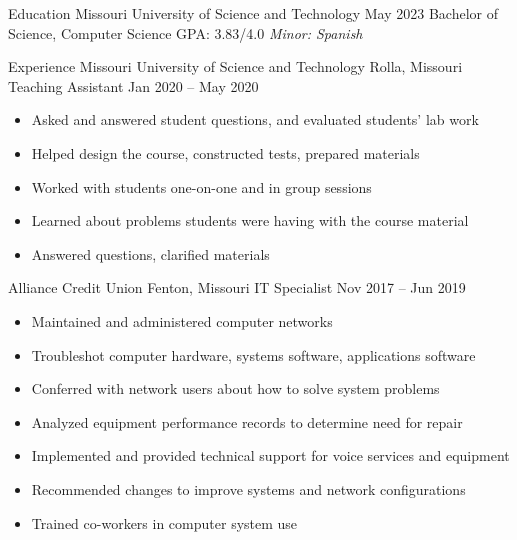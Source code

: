 \documentclass[
    name = {{Evan Elias Young}},
    web = {{EvanEliasYoung.com}},
    schooladdr = {{1300 Whitney Lane; Rolla, Missouri 65401 ; eeymrr@mst.edu}},
    homeaddr = {{403 Valparaiso Court; Valley Park, Missouri 63088 ; +1 (314) 277-7058}},
]{eey-resume}
\begin{document}
\begin{eeyrssection}{Education}
    \eeyrsposition%
        {Missouri University of Science and Technology}%
        {May 2023}%
        {Bachelor of Science, Computer Science}%
        {GPA: 3.83/4.0}%
        {\textit{Minor: Spanish}}
\end{eeyrssection}

\begin{eeyrssection}{Experience}
    \eeyrsposition%
        {Missouri University of Science and Technology}%
        {Rolla, Missouri}%
        {Teaching Assistant}%
        {Jan 2020 -- May 2020}%
        {%
            \begin{itemize}
                \item Asked and answered student questions, and evaluated students' lab work
                \item Helped design the course, constructed tests, prepared materials
                \item Worked with students one-on-one and in group sessions
                \item Learned about problems students were having with the course material
                \item Answered questions, clarified materials
            \end{itemize}
        }

    \eeyrsposition%
        {Alliance Credit Union}%
        {Fenton, Missouri}%
        {IT Specialist}%
        {Nov 2017 -- Jun 2019}%
        {%
            \begin{itemize}
                \item Maintained and administered computer networks
                \item Troubleshot computer hardware, systems software, applications software
                \item Conferred with network users about how to solve system problems
                \item Analyzed equipment performance records to determine need for repair
                \item Implemented and provided technical support for voice services and equipment
                \item Recommended changes to improve systems and network configurations
                \item Trained co-workers in computer system use
            \end{itemize}
        }


\end{eeyrssection}
\end{document}
